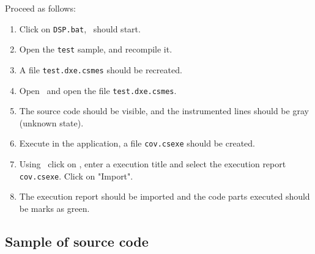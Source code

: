 Proceed as follows:
\begin{enumerate}
\item Click on \verb$DSP.bat$, \VisualDSP\ should start.
\item Open the \verb$test$ sample, and recompile it.
\item A file \verb$test.dxe.csmes$ should be recreated.
\item Open \CoverageBrowser\ and open the file \verb$test.dxe.csmes$.
\item The source code should be visible, and the instrumented lines should be gray (unknown state).
\item Execute in the application, a file \verb$cov.csexe$ should be created.
\item Using \CoverageBrowser\ click on , enter a execution title and select
      the execution report \verb$cov.csexe$. Click on "Import".
\item The execution report should be imported and the code parts executed should be marks as green.

\end{enumerate}


\subsection{Sample of source code}

